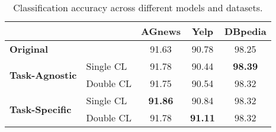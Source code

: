 \begin{table*}[h]
    \centering
    \begin{tabular}{|l|l|c|c|c|}
        \hline
        \multicolumn{2}{|c|}{} & \textbf{AGnews} & \textbf{Yelp} & \textbf{DBpedia} \\
        \hline
        \multicolumn{2}{|l|}{\textbf{Original}} & 91.63 & 90.78 & 98.25 \\
        \hline
        \multirow{2}{*}{\textbf{Task-Agnostic}} & Single CL & 91.78 & 90.44 & \textbf{98.39} \\
        & Double CL & 91.75 & 90.54 & 98.32 \\
        \hline
        \multirow{2}{*}{\textbf{Task-Specific}} & Single CL & \textbf{91.86} & 90.84 & 98.32 \\
        & Double CL & 91.78 & \textbf{91.11} & 98.32 \\
        \hline
    \end{tabular}
    \caption{Classification accuracy across different models and datasets.}
    \label{tab:accuracy_results}
\end{table*}

